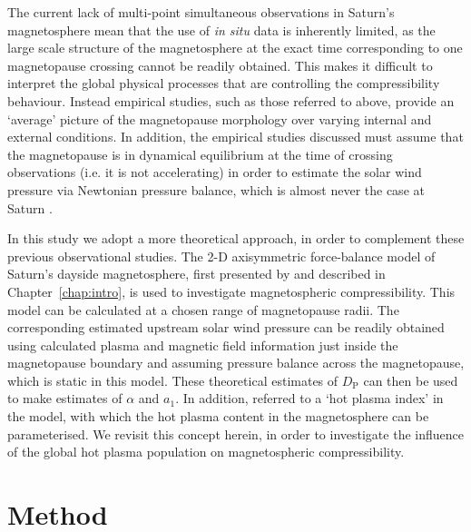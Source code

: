 The current lack of multi-point simultaneous observations in Saturn's magnetosphere mean that the use of \textit{in situ} data is inherently limited, as the large scale structure of the magnetosphere at the exact time corresponding to one magnetopause crossing cannot be readily obtained. This makes it difficult to interpret the global physical processes that are controlling the compressibility behaviour. Instead empirical studies, such as those referred to above, provide an `average' picture of the magnetopause morphology over varying internal and external conditions. In addition, the empirical studies discussed must assume that the magnetopause is in dynamical equilibrium at the time of crossing observations (i.e. it is not accelerating) in order to estimate the solar wind pressure via Newtonian pressure balance, which is almost never the case at Saturn \cite[e.g.][]{dougherty2005,masters2011,pilkington2015}.

In this study we adopt a more theoretical approach, in order to complement these previous observational studies. The 2-D axisymmetric force-balance model of Saturn's dayside magnetosphere, first presented by \citet{achilleos2010a} and described in Chapter~\ref{chap:intro}, is used to investigate magnetospheric compressibility. This model can be calculated at a chosen range of magnetopause radii. The corresponding estimated upstream solar wind pressure can be readily obtained using calculated plasma and magnetic field information just inside the magnetopause boundary and assuming pressure balance across the magnetopause, which is static in this model. These theoretical estimates of $D_\mathrm{P}$ can then be used to make estimates of $\alpha$ and $a_1$. In addition, \citet{achilleos2010a} referred to a `hot plasma index' in the model, with which the hot plasma content in the magnetosphere can be parameterised. We revisit this concept herein, in order to investigate the influence of the global hot plasma population on magnetospheric compressibility.

\section{Method}\label{compress:sec:method}
